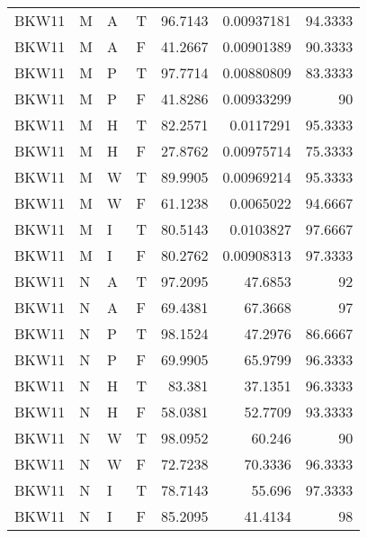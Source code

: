 \begin{tabular}{llllrrr}
    BKW11    & M     & A     & T          & 96.7143    & 0.00937181 & 94.3333  \\
    BKW11    & M     & A     & F          & 41.2667    & 0.00901389 & 90.3333  \\
    BKW11    & M     & P     & T          & 97.7714    & 0.00880809 & 83.3333  \\
    BKW11    & M     & P     & F          & 41.8286    & 0.00933299 & 90       \\
    BKW11    & M     & H     & T          & 82.2571    & 0.0117291  & 95.3333  \\
    BKW11    & M     & H     & F          & 27.8762    & 0.00975714 & 75.3333  \\
    BKW11    & M     & W     & T          & 89.9905    & 0.00969214 & 95.3333  \\
    BKW11    & M     & W     & F          & 61.1238    & 0.0065022  & 94.6667  \\
    BKW11    & M     & I     & T          & 80.5143    & 0.0103827  & 97.6667  \\
    BKW11    & M     & I     & F          & 80.2762    & 0.00908313 & 97.3333  \\
    BKW11    & N     & A     & T          & 97.2095    & 47.6853    & 92       \\
    BKW11    & N     & A     & F          & 69.4381    & 67.3668    & 97       \\
    BKW11    & N     & P     & T          & 98.1524    & 47.2976    & 86.6667  \\
    BKW11    & N     & P     & F          & 69.9905    & 65.9799    & 96.3333  \\
    BKW11    & N     & H     & T          & 83.381     & 37.1351    & 96.3333  \\
    BKW11    & N     & H     & F          & 58.0381    & 52.7709    & 93.3333  \\
    BKW11    & N     & W     & T          & 98.0952    & 60.246     & 90       \\
    BKW11    & N     & W     & F          & 72.7238    & 70.3336    & 96.3333  \\
    BKW11    & N     & I     & T          & 78.7143    & 55.696     & 97.3333  \\
    BKW11    & N     & I     & F          & 85.2095    & 41.4134    & 98       \\
    \hline
\end{tabular}